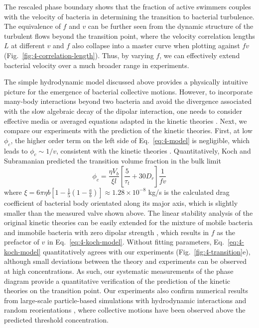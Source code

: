 The rescaled phase boundary shows that the fraction of active swimmers couples with the velocity of bacteria in determining the transition to bacterial turbulence. The equivalence of $f$ and $v$ can be further seen from the dynamic structure of the turbulent flows beyond the transition point, where the velocity correlation lengths $L$ at different $v$ and $f$ also collapse into a master curve when plotting against $fv$ (Fig.~\ref{fig:4-correlation-length}). Thus, by varying $f$, we can effectively extend bacterial velocity over a much broader range in experiments.

The simple hydrodynamic model discussed above provides a physically intuitive picture for the emergence of bacterial collective motions. However, to incorporate many-body interactions beyond two bacteria and avoid the divergence associated with the slow algebraic decay of the dipolar interaction, one needs to consider effective media or averaged equations adapted in the kinetic theories \cite{Subramanian2009}. Next, we compare our experiments with the prediction of the kinetic theories. First, at low $\phi_c$, the higher order term on the left side of Eq.~\ref{eq:4-model} is negligible, which leads to $\phi_c \sim 1/v$, consistent with the kinetic theories \cite{Koch2011, Stenhammar2017, Bardfalvy2020}. Quantitatively, Koch and Subramanian predicted the transition volume fraction in the bulk limit \cite{Koch2011}
\begin{equation}
  \label{eq:4-koch-model}
  \phi_c = \frac{\eta V_b}{\xi l}\left[ \frac{5}{\tau_t} + 30D_r \right] \frac{1}{fv}
\end{equation}
where $\xi = 6\pi\eta b \left[ 1-\frac{1}{5}(1-\frac{a}{b}) \right] \approx 1.28 \times 10^{-8}$ kg/s is the calculated drag coefficient of bacterial body
orientated along its major axis, which is slightly smaller than the measured valve shown above. The linear stability analysis of the original kinetic theories can be easily extended for the mixture of mobile bacteria and immobile bacteria with zero dipolar strength \cite{Subramanian2009, Bardfalvy2020}, which results in $f$ as the prefactor of $v$ in Eq.~\ref{eq:4-koch-model}.
Without fitting parameters, Eq.~\ref{eq:4-koch-model} quantitatively agrees with our experiments (Fig.~\ref{fig:4-transition}e), although small deviations between the theory and experiments can be observed at high concentrations. As such, our systematic measurements of the phase diagram provide a quantitative verification of the prediction of the kinetic theories on the transition point.
Our experiments also confirm numerical results from large-scale particle-based simulations with hydrodynamic interactions and random reorientations \cite{Krishnamurthy2015, Bardfalvy2019}, where collective motions have been observed above the predicted threshold concentration.


